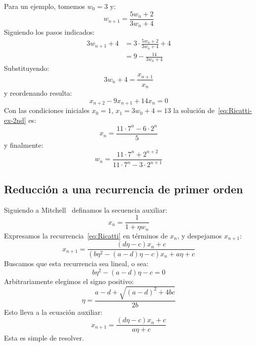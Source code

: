   Para un ejemplo,
  tomemos \(w_0 = 3\) y:
  \begin{equation}
    \label{eq:Ricatti-ex}
    w_{n + 1}
      = \frac{5 w_n + 2}{3 w_n + 4}
  \end{equation}
  Siguiendo los pasos indicados:
  \begin{align*}
    3 w_{n + 1} + 4
      &= 3 \cdot \frac{5 w_n + 2}{3 w_n + 4} + 4 \\
      &= 9 - \frac{14}{3 w_n + 4}
  \end{align*}
  Substituyendo:
  \begin{equation*}
    3 w_n + 4
      = \frac{x_{n + 1}}{x_n}
  \end{equation*}
  y reordenando resulta:
  \begin{equation}
    \label{eq:Ricatti-ex-2nd}
    x_{n + 2} - 9 x_{n + 1} + 14 x_n
      = 0
  \end{equation}
  Con las condiciones iniciales \(x_0 = 1\), \(x_1 = 3 w_0 + 4 = 13\)
  la solución de~\eqref{eq:Ricatti-ex-2nd} es:
  \begin{equation*}
    x_n
      = \frac{11 \cdot 7^n - 6 \cdot 2^n}{5}
  \end{equation*}
  y finalmente:
  \begin{equation}
    \label{eq:Ricatti-ex-2nd-sol}
    w_n
      = \frac{11 \cdot 7^n + 2^{n + 2}}{11 \cdot 7^n - 3 \cdot 2^{n + 1}}
  \end{equation}

\subsection{Reducción a una recurrencia de primer orden}
\label{sec:Ricatti-1}

  Siguiendo a Mitchell~%
    \cite{mitchell00:_riccati_solution}
  definamos la secuencia auxiliar:
  \begin{equation}
    \label{eq:Ricatti-1st-x}
    x_n
      = \frac{1}{1 + \eta w_n}
  \end{equation}
  Expresamos la recurrencia~\eqref{eq:Ricatti}
  en términos de \(x_n\),
  y despejamos \(x_{n + 1}\):
  \begin{equation*}
    x_{n + 1}
      = \frac{(d \eta - c) x_n + c}
	     {(b \eta^2 - (a - d) \eta - c) x_n + a \eta + c}
  \end{equation*}
  Buscamos que esta recurrencia sea lineal,
  o sea:
  \begin{equation*}
    b \eta^2 - (a - d) \eta - c
      = 0
  \end{equation*}
  Arbitrariamente elegimos el signo positivo:
  \begin{equation}
    \label{eq:Ricatti-1st-aux-eta}
    \eta
      = \frac{a - d + \sqrt{(a - d)^2 + 4 b c}}{2 b}
  \end{equation}
  Esto lleva a la ecuación auxiliar:
  \begin{equation}
    \label{eq:Ricatti-1st-aux}
    x_{n + 1}
      = \frac{(d \eta - c) x_n + c}{a \eta + c}
  \end{equation}
  Esta es simple de resolver.

